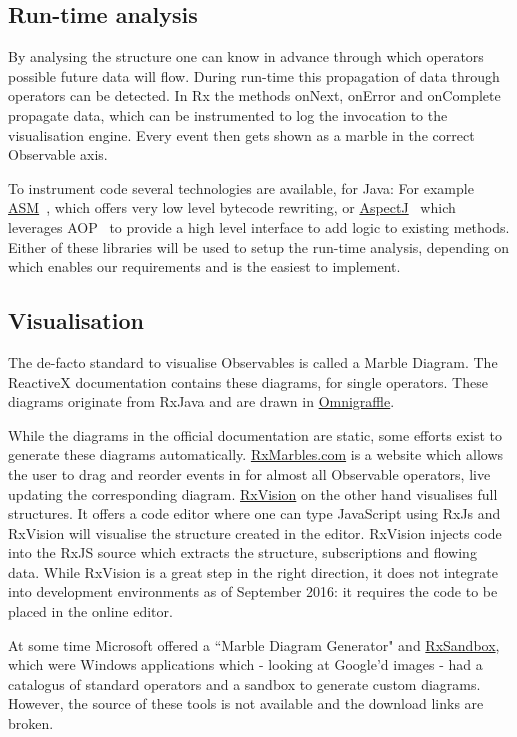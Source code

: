 \subsection{Run-time analysis} By analysing the structure one can know
in advance through which operators possible future data will flow.
During run-time this propagation of data through operators can be
detected.  In Rx the methods onNext, onError and onComplete propagate
data, which can be instrumented to log the invocation to the
visualisation engine.  Every event then gets shown as a marble in the
correct Observable axis.

To instrument code several technologies are available, for Java:  For
example \href{http://asm.ow2.org}{ASM}~\cite{bruneton2002asm,
kuleshov2007using}, which offers very low level bytecode rewriting, or
\href{http://www.eclipse.org/aspectj/}{AspectJ}~\cite{kiczales2001overview}
which leverages AOP~\cite{kiczales1997aspect} to provide a high level
interface to add logic to existing methods.  Either of these libraries
will be used to setup the run-time analysis, depending on which enables
our requirements and is the easiest to implement.

\subsection{Visualisation} The de-facto standard to visualise
Observables is called a Marble Diagram.  The ReactiveX documentation
contains these diagrams, for single operators.  These diagrams originate
from RxJava and are drawn in \href{https://www.omnigroup.com/omnigraffle}
{Omnigraffle}.

While the diagrams in the official documentation are static, some
efforts exist to generate these diagrams automatically.  \href{http://RxMarbles.com}
{RxMarbles.com} is a website which allows the user to drag and reorder
events in for almost all Observable operators, live updating the
corresponding diagram.  \href{https://github.com/jaredly/rxvision}{RxVision}
on the other hand visualises full structures.  It offers a code editor
where one can type JavaScript using RxJs and RxVision will visualise the
structure created in the editor.  RxVision injects code into the RxJS
source which extracts the structure, subscriptions and flowing data.
While RxVision is a great step in the right direction, it does not
integrate into development environments as of September 2016:  it
requires the code to be placed in the online editor.

At some time Microsoft offered a ``Marble Diagram Generator" and \href{http://mnajder.blogspot.nl/2010/03/rxsandbox-v1.html}
{RxSandbox}, which were Windows applications which - looking at Google'd
images - had a catalogus of standard operators and a sandbox to generate
custom diagrams.  However, the source of these tools is not available
and the download links are broken.

